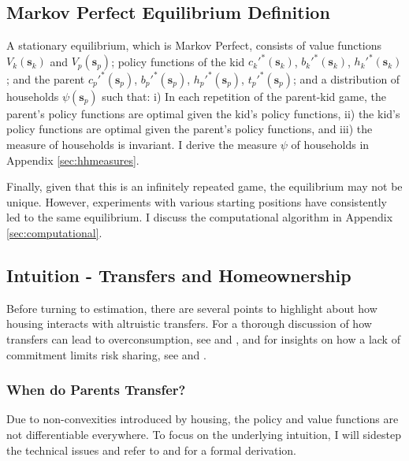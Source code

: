 \documentclass[12pt]{article}
\begin{document}
\subsection{Markov Perfect Equilibrium Definition}
A stationary equilibrium, which is Markov Perfect, consists of value functions $V_k(\mathbf{s}_k)$ and $V_p(\mathbf{s}_p)$; policy functions of the kid $c_k'^*(\mathbf{s}_k)$, $b_k'^*(\mathbf{s}_k)$, $h_k'^*(\mathbf{s}_k)$; and the parent $c_p'^*(\mathbf{s}_p)$, $b_p'^*(\mathbf{s}_p)$, $h_p'^*(\mathbf{s}_p)$, $t_p'^*(\mathbf{s}_p)$; and a distribution of households $\psi(\mathbf{s}_p)$ such that: i) In each repetition of the parent-kid game, the parent's policy functions are optimal given the kid's policy functions, ii) the kid's policy functions are optimal given the parent's policy functions, and iii) the measure of households is invariant. I derive the measure $\psi$ of households in Appendix \ref{sec:hhmeasures}.

Finally, given that this is an infinitely repeated game, the equilibrium may not be unique. However, experiments with various starting positions have consistently led to the same equilibrium. I discuss the computational algorithm in Appendix \ref{sec:computational}.


\subsection{Intuition - Transfers and Homeownership}\label{sec:modelintuition}
Before turning to estimation, there are several points to highlight about how housing interacts with altruistic transfers. For a thorough discussion of how transfers can lead to overconsumption, see \cite{Altonji1997a} and \cite{Barczyk2014}, and for insights on how a lack of commitment limits risk sharing, see \cite{Attanasio2018} and \cite{Mommaerts2016}. 

\subsubsection{When do Parents Transfer?}
Due to non-convexities introduced by housing, the policy and value functions are not differentiable everywhere. To focus on the underlying intuition, I will sidestep the technical issues and refer to \cite{Barczyk2020} and \cite{Chu2020} for a formal derivation.
\end{document}

